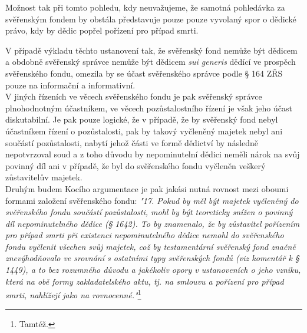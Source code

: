 \documentclass{article}
\begin{document}
  Možnost tak při tomto pohledu, kdy neuvažujeme, že samotná pohledávka za svěřenským fondem by obstála představuje pouze pouze vyvolaný spor o dědické právo, kdy by dědic popřel pořízení pro případ smrti.
 
 
 
 
 V případě výkladu těchto ustanovení tak, že svěřenský fond nemůže být dědicem a obdobně svěřenský správce nemůže být dědicem \textit{sui generis} dědící ve prospěch svěřenského fondu, omezila by se účast svěřenského správce podle § 164 ZŘS pouze na informační a informativní.\\
 
 V jiných řízeních ve věcech svěřenského fondu je pak svěřenský správce plnohodnotným účastníkem, ve věcech pozůstalostního řízení je však jeho účast diskutabilní. Je pak pouze logické, že v případě, že by svěřenský fond nebyl účastníkem řízení o pozůstalosti, pak by takový vyčleněný majetek nebyl ani součástí pozůstalosti, nabytí jehož části ve formě dědictví by následně nepotvrzoval soud a z toho důvodu by nepominutelní dědici neměli nárok na svůj povinný díl ani v případě, že byl do svěřenského fondu vyčleněn veškerý zůstavitelův majetek.\\
 
 
 Druhým budem Kocího argumentace je pak jakási nutná rovnost mezi oboumi formami založení svěřenského fondu: \textit{"17. Pokud by měl být majetek vyčleněný do svěřenského fondu součástí pozů­stalosti, mohl by být teoreticky snížen o povinný díl nepominutelného dědice (§ 1642). To by znamenalo, že by zůstavitel pořízením pro případ smrti při existenci nepominutelného dědice nemohl do svěřenského fondu vyčlenit všechen svůj majetek, což by testamentární svěřenský fond značně znevýhodňovalo ve srovnání s ostatními typy svěřenských fondů (viz komentář k § 1449), a to bez rozumného důvodu a jakékoliv opory v ustanoveních o jeho vzniku, která na obě formy zakladatelského aktu, tj. na smlouvu a pořízení pro případ smrti, nahlížejí jako na rovnocenné."}\footnote{Tamtéž.}\\
 
\end{document}
